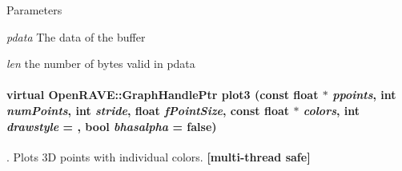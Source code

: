 \begin{DoxyParams}{Parameters}
\item[{\em pdata}]The data of the buffer \item[{\em len}]the number of bytes valid in pdata \end{DoxyParams}
\hypertarget{classOpenRAVE_1_1EnvironmentBase_a367a6d07f961f2ed0a48378c7dea2336}{
\paragraph[{plot3}]{\setlength{\rightskip}{0pt plus 5cm}virtual OpenRAVE::GraphHandlePtr plot3 (const float $\ast$ {\em ppoints}, \/  int {\em numPoints}, \/  int {\em stride}, \/  float {\em fPointSize}, \/  const float $\ast$ {\em colors}, \/  int {\em drawstyle} = {}, \/  bool {\em bhasalpha} = {\ttfamily false})}\hfill}
\label{classOpenRAVE_1_1EnvironmentBase_a367a6d07f961f2ed0a48378c7dea2336}


. Plots 3D points with individual colors. {\bfseries \mbox{[}multi-\/thread safe\mbox{]}} 

